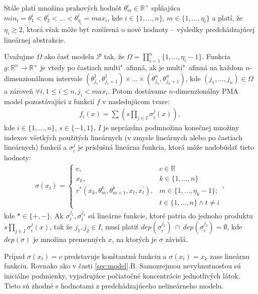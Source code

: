 \documentclass[11pt,final,oneside]{fithesis}
\begin{document}
St\'ale plat\'i mno\v zina prahov\'ych hodn\^ ot 
$\theta_m^i \in \mathbb{R}^+$ sp\'l\v naj\'uca $min_i = \theta_1^i < \theta_2^i < \dots{} < \theta_{\eta_i}^i = max_i$, kde $i \in \{1,\dots{},n\}$, 
$m \in \{1,\dots{},\eta_i\}$ a plat\'i, \v ze $\eta_i \geq 2$, ktor\'a v\v sak m\^ o\v ze by\v t roz\v s\'iren\'a o nov\'e hodnoty -- v\'ysledky 
predch\'adzaj\'ucej line\'arnej abstrakcie.

Uva\v zujme $\Omega$ ako \v cas\v t modelu $\mathcal{P}$ tak, \v ze $\Omega = \prod_{i = 1}^n\{1,\dots{},\eta_i - 1\}$. Funkcia 
$g : \mathbb{R}^n \rightarrow \mathbb{R}^+$ je vtedy po \v castiach multi"~afinn\'a, ak je multi"~afinn\'a na ka\v zdom $n$-dimenzion\'alnom intervale
$(\theta_{j_1}^1,\theta_{j_1 + 1}^1)\times \dots{} \times (\theta_{j_n}^n,\theta_{j_n + 1}^n)$, kde $(j_1,\dots{},j_n) \in \Omega$ a z\'arove\v n 
$\forall{}i, 1 \leq i \leq n, j_i < max_i$. Potom dost\'avame $n$-dimenzion\'alny PMA model pozost\'avaj\'uci z funkci\'i $f$ v nasleduj\'ucom tvare:
\begin{align}
\label{eq:equationDescribtion2}
f_i(x) = \sum (s\underset{j \in I}\prod{\sigma_i^j(x)}),
\end{align}
kde $i \in \{1,\dots{},n\}$, $s \in \{-1,1\}$, $I$ je nepr\'azdna podmno\v zina kone\v cnej mno\v ziny indexov v\v setk\'ych pou\v zit\'ych line\'arnych 
(v zmysle line\'arnych alebo po \v castiach line\'arnych) 
funkci\'i a $\sigma_i^j$ je pr\'islu\v sn\'a line\'arna funkcia, ktor\'a m\^ o\v ze nadob\'uda\v t tieto hodnoty:
\begin{align}
\label{eq:regulatingFunctions2}
\sigma(x_t) = 
\left\{ \begin{array}{cl}
c, &c \in \mathbb{R}\\
x_k, & k \in \{1,\dots{},n\}\\
r^*(x_k,\theta_m^k,\theta_{m+1}^k,x_t,x_t^{'}), &m \in \{1,\dots{},\eta_k-1\};\\
&t \in \{1,\dots{},n\} \wedge t \neq i
\end{array} \right. ,
\end{align}
kde $* \in \{+,-\}$. Ak $\sigma_i^{j_1}, \sigma_i^{j_2}$ s\'u line\'arne funkcie, ktor\'e patria do jednoho produktu $s\underset{j \in I}\prod\sigma_i^j(x)$,
tak \v ze $j_1, j_2 \in I$, mus\'i plati\v t $dep(\sigma_i^{j_1})\ \cap\ dep(\sigma_i^{j_2}) = \emptyset$, kde $dep(\sigma)$ je mno\v zina premenn\'ych $x$,
na ktor\'ych je $\sigma$ z\'avisl\'a.

Pr\'ipad $\sigma(x_t) = c$ predstavuje kon\v stantn\'u funkciu a $\sigma(x_t) = x_k$ zase line\'arnu funkciu. Rovnako ako v \v casti \ref{sec:model}.B. 
Samozrejmou nevyhnutnos\v tou s\'u inici\'alne podmienky, vyjadruj\'uce 
po\v ciato\v cn\'e koncentr\'acie jednotliv\'ych l\'atok. Tieto s\'u zhodn\'e s hodnotami z predch\'adzaj\'uceho neline\'arneho modelu.
\end{document}

